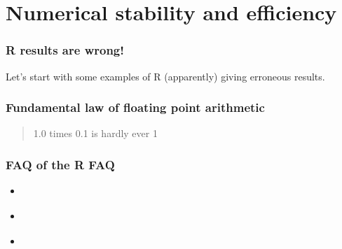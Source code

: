 \section{Numerical stability and efficiency}

\begin{frame}
  \frametitle{R results are wrong!}

  Let's start with some examples of R (apparently) giving erroneous
  results.

\end{frame}

\begin{frame}
  \frametitle{Fundamental law of floating point arithmetic}

  \begin{quote}
    1.0 times 0.1 is hardly ever 1 \citep{Kernighan:style:1978}
  \end{quote}
\end{frame}

\begin{frame}
  \frametitle{FAQ of the R FAQ}

  \begin{itemize}
  \item {} \citep[question 7.31]{R-FAQ}
  \item {}
    \citep[Appendix G]{Heiberger:2015:statistical_analysis}
  \item {} \citep{Goldberg:1991:floating_point}
  \end{itemize}
\end{frame}

